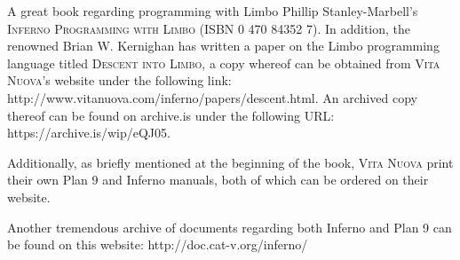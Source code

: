 \documentclass[a5paper,twoside,12pt]{report}
\begin{document}
A great book regarding programming with Limbo Phillip Stanley-Marbell's \textsc{Inferno Programming with Limbo} (ISBN 0 470 84352 7). In addition, the renowned Brian W. Kernighan has written a paper on the Limbo programming language titled \textsc{Descent into Limbo}, a copy whereof can be obtained from \textsc{Vita Nuova}'s website under the following link: http://www.vitanuova.com/inferno/papers/descent.html. An archived copy thereof can be found on archive.is under the following URL: https://archive.is/wip/eQJ05.

Additionally, as briefly mentioned at the beginning of the book, \textsc{Vita Nuova} print their own Plan 9 and Inferno manuals, both of which can be ordered on their website.

Another tremendous archive of documents regarding both Inferno and Plan 9 can be found on this website: http://doc.cat-v.org/inferno/
\end{document}
